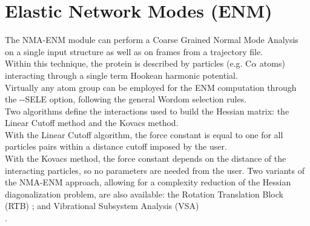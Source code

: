 \documentclass[11pt,twoside,onecolumn,a4paper,openright,notitlepage]{book}[2001/04/21]
\begin{document}
\section{Elastic Network Modes (ENM)}
The NMA-ENM module can perform a Coarse Grained Normal Mode Analysis on a single input structure as well as on frames from a trajectory file.\\
Within this technique, the protein is described by particles (e.g. C$\alpha{}$ atoms) interacting through a single term Hookean harmonic potential\cite{tirion:96}.\\
Virtually any atom group can be employed for the ENM computation through the -{}-SELE option, following the general Wordom selection rules.\\
Two algorithms define the interactions used to build the Hessian matrix: the Linear Cutoff method\cite{delarue:2002} and the Kovacs method\cite{kovacs:ppf}.\\
With the Linear Cutoff algorithm, the force constant is equal to one for all particles pairs within a distance cutoff imposed by the user.\\
With the Kovacs method, the force constant depends on the distance of the interacting particles, so no parameters are needed from the user.
Two variants of the NMA-ENM approach, allowing for a complexity reduction of the Hessian diagonalization problem, are also available: the Rotation Translation Block (RTB) \cite{Durand:1994};\cite{Tama:2000} and Vibrational Subsystem Analysis (VSA) \cite{Zheng:2005a}\\.
\end{document}
